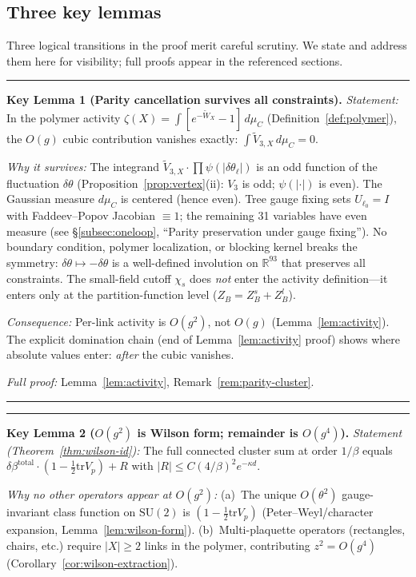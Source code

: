\documentclass[11pt]{article}
\theoremstyle{definition}
\newcommand{\SU}{\mathrm{SU}}
\newcommand{\tr}{\mathrm{tr}}
\newcommand{\R}{\mathbb{R}}
\begin{document}
\subsection{Three key lemmas}%
\label{subsec:three-key}

Three logical transitions in the proof merit careful scrutiny.
We state and address them here for visibility;
full proofs appear in the referenced sections.

\medskip\noindent\hrule\smallskip
\textbf{Key Lemma 1 (Parity cancellation survives all constraints).}
\emph{Statement:} In the polymer activity
$\zeta(X)=\int[e^{-\widetilde{W}_X}-1]\,d\mu_C$
(Definition~\ref{def:polymer}), the $O(g)$ cubic
contribution vanishes exactly:
$\int\widetilde{V}_{3,X}\,d\mu_C=0$.

\emph{Why it survives:}
The integrand $\widetilde{V}_{3,X}\cdot\prod\psi(|\delta\theta_\ell|)$
is an odd function of the fluctuation $\delta\theta$
(Proposition~\ref{prop:vertex}(ii): $V_3$ is odd;
$\psi(|\cdot|)$ is even).
The Gaussian measure $d\mu_C$ is centered (hence even).
Tree gauge fixing sets $U_{\ell_0}=I$ with
Faddeev--Popov Jacobian $\equiv 1$;
the remaining 31 variables have even measure
(see \S\ref{subsec:oneloop}, ``Parity preservation
under gauge fixing'').
No boundary condition, polymer localization, or
blocking kernel breaks the symmetry:
$\delta\theta\mapsto-\delta\theta$ is a well-defined
involution on $\R^{93}$ that preserves all constraints.
The small-field cutoff $\chi_s$ does \emph{not} enter
the activity definition---it enters only at the
partition-function level ($Z_B=Z_B^s+Z_B^l$).

\emph{Consequence:}
Per-link activity is $O(g^2)$, not $O(g)$
(Lemma~\ref{lem:activity}).
The explicit domination chain
(end of Lemma~\ref{lem:activity} proof)
shows where absolute values enter: \emph{after}
the cubic vanishes.

\emph{Full proof:} Lemma~\ref{lem:activity},
Remark~\ref{rem:parity-cluster}.
\smallskip\hrule\medskip

\medskip\noindent\hrule\smallskip
\textbf{Key Lemma 2 ($O(g^2)$ is Wilson form; remainder is $O(g^4)$).}
\emph{Statement (Theorem~\ref{thm:wilson-id}):}
The full connected cluster sum at order $1/\beta$ equals
$\delta\beta^{\mathrm{total}}\cdot(1-\frac{1}{2}\tr V_p)
+R$ with $|R|\le C(4/\beta)^2 e^{-\kappa d}$.

\emph{Why no other operators appear at $O(g^2)$:}
(a)~The unique $O(\theta^2)$ gauge-invariant class function
on $\SU(2)$ is $(1-\frac{1}{2}\tr V_p)$
(Peter--Weyl/character expansion,
Lemma~\ref{lem:wilson-form}).
(b)~Multi-plaquette operators (rectangles, chairs, etc.)
require $|X|\ge 2$ links in the polymer, contributing
$z^2=O(g^4)$ (Corollary~\ref{cor:wilson-extraction}).
\end{document}
